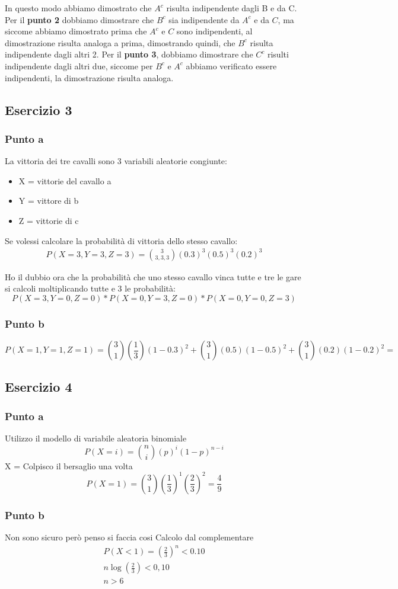 \documentclass[12pt]{article}
\begin{document}
\newpage
In questo modo abbiamo dimostrato che \(A^c\) risulta indipendente dagli B e da C.
\newline
Per il \textbf{punto 2} dobbiamo dimostrare che \(B^c\) sia indipendente da \(A^c\) e da \(C\), ma siccome
abbiamo dimostrato prima che \(A^c\) e \(C\) sono indipendenti, al dimostrazione risulta analoga a prima, dimostrando quindi,
che \(B^c\) risulta indipendente dagli altri 2. 
Per il \textbf{punto 3}, dobbiamo dimostrare che \(C^c\) risulti indipendente dagli altri due, siccome per
\(B^c\) e \(A^c\) abbiamo verificato essere indipendenti, la dimostrazione risulta analoga.
\subsection*{Esercizio 3}
\subsubsection*{Punto a}

La vittoria dei tre cavalli sono 3 variabili aleatorie congiunte:
\begin{itemize}
    \item X = vittorie del cavallo a
    \item Y = vittore di b
    \item Z = vittorie di c
\end{itemize}

Se volessi calcolare la probabilità di vittoria dello stesso cavallo:
\begin{align*}
    P(X=3,Y=3,Z=3) = \binom{3}{3,3,3}\left(0.3\right)^3\left(0.5\right)^3\left(0.2\right)^3
\end{align*}

Ho il dubbio ora che la probabilità che uno stesso cavallo vinca tutte e tre le gare si calcoli moltiplicando tutte e 3 le probabilità:
\[
    P(X=3,Y=0,Z=0) * P(X=0,Y=3,Z=0) * P(X=0,Y=0,Z=3)    
\]

\subsubsection*{Punto b}
\[
    P(X=1,Y=1,Z=1) = \binom{3}{1}\left(\frac{1}{3}\right)\left(1-0.3\right)^2 + \binom{3}{1}\left(0.5\right)\left(1 -0.5\right)^2 + \binom{3}{1}\left(0.2\right) \left(1 - 0.2\right)^2 =    
\]
\subsection*{Esercizio 4}
\subsubsection*{Punto a}
Utilizzo il modello di variabile aleatoria binomiale
\[
P(X=i) = \binom{n}{i} (p)^i (1-p)^{n-i}    
\]
X = Colpisco il bersaglio una volta
\[
P(X=1) = \binom{3}{1} \left(\frac{1}{3}\right)^1 \left(\frac{2}{3}\right)^2 = \frac{4}{9}   
\]  

\subsubsection*{Punto b}
Non sono sicuro però penso si faccia cosi
\newline
Calcolo dal complementare
\begin{align*}
    P(X<1) = \left(\frac{2}{3}\right)^n < 0.10 \\
    n\log(\frac{2}{3}) < 0,10 \\
    n > 6
\end{align*}
\end{document}
